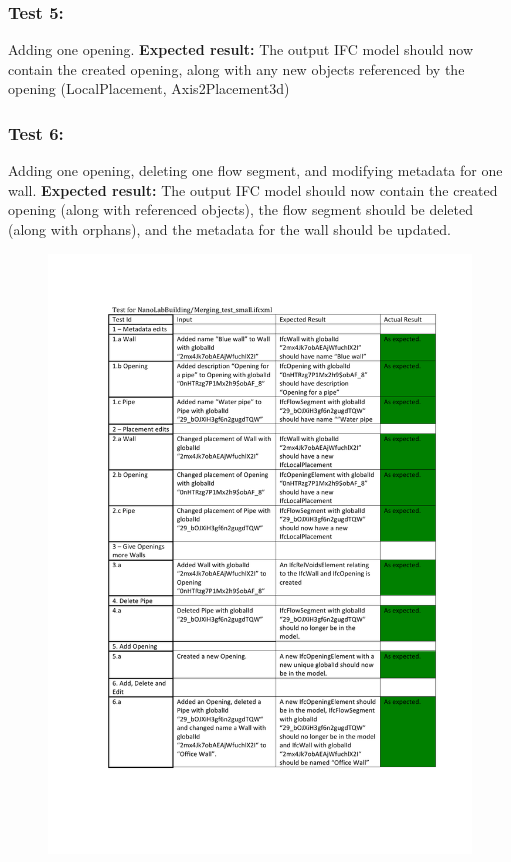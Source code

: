 \subsubsection{Test 5:}
Adding one opening.
\textbf{Expected result:} The output IFC model should now contain the created opening, along with any new objects referenced by the opening (LocalPlacement, Axis2Placement3d)
\subsubsection{Test 6:}
Adding one opening, deleting one flow segment, and modifying metadata for one wall.
\textbf{Expected result:} The output IFC model should now contain the created opening (along with referenced objects), the flow segment should be deleted (along with orphans), and the metadata for the wall should be updated.
\begin{figure}
    \centering
        \centerline{\includegraphics[width=150mm]{images/Test1.pdf}}
    \caption{}
    \label{fig:test1}
\end{figure}

